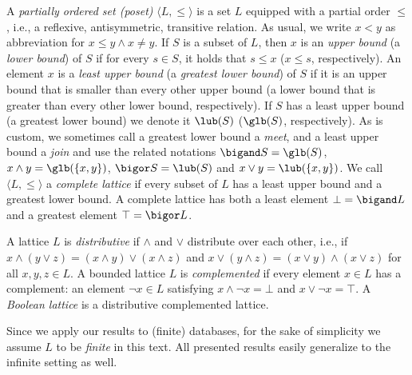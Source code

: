 A \emph{partially ordered set (poset)} $\langle L,\leq\rangle$ is a set $L$ equipped with a partial order $\leq$, i.e., a reflexive, antisymmetric, transitive relation. 
As usual, we write $x<y$ as abbreviation for $x\leq y \land x\neq y$.
If $S$ is a subset of $L$, then $x$ is an \emph{upper bound} (a \emph{lower bound}) of $S$ if for every $s\in S$, it holds that $s\leq x$ ($x\leq s$, respectively).
An element $x$ is a \emph{least upper bound} (a \emph{greatest lower bound}) of $S$ if it is an upper bound that is smaller than every other upper bound (a lower bound that is greater than every other lower bound, respectively).
If $S$ has a least upper bound (a greatest lower bound) we denote it $\lub(S)$ ($\glb(S)$, respectively).
As is custom, we sometimes call a greatest lower bound a \emph{meet}, and a least upper bound a \emph{join} and use the related notations $\bigand S = \glb(S)$, $x\land y=\glb(\{x,y\})$, $\bigor S = \lub(S)$ and $x\lor y=\lub(\{x,y\})$.
 We call $\langle L,\leq\rangle$ a \emph{complete lattice}  if every subset of $L$ has a least upper bound and a greatest lower bound. 
A complete lattice has both a least element $\bot = \bigand L$ and a greatest element $\top = \bigor L$. 

A lattice $L$ is \emph{distributive} if $\land$ and $\lor$ distribute over each other, i.e., if $x\land(y\lor z)=(x\land y)\lor(x\land z)$ and $x\lor(y\land z)=(x\lor y)\land(x\lor z)$ for all $x,y,z\in L$.
A bounded lattice $L$ is \emph{complemented} if every element $x\in L$ has a complement: an element $\lnot x \in L$
satisfying $x\land \lnot x = \bot $ and $x\lor \lnot x = \top$. A \emph{Boolean lattice} is a distributive
complemented lattice.

Since we apply our results to (finite) databases, for the sake of simplicity we assume $L$ to be \emph{finite} in this text. All presented results easily generalize to the infinite setting as well. 

